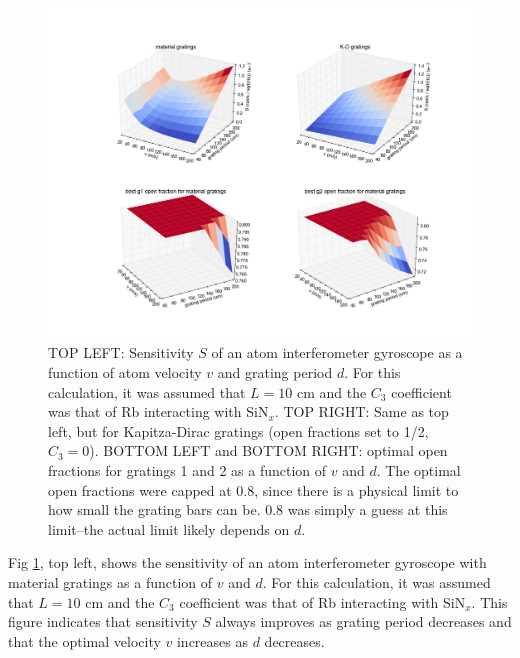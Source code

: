 \documentclass[twocolumn,pra,showpacs,superscriptaddress,longbibliography]{revtex4-1}   %
\begin{document}
\begin{figure}
\includegraphics[width=\linewidth,keepaspectratio]{../plots/Sf1f2_vs_dv_Rb_L10cm.png}
\caption{\label{S_vs_dv} TOP LEFT: Sensitivity $S$ of an atom interferometer gyroscope as a function of atom velocity $v$ and grating period $d$. For this calculation, it was assumed that $L = 10$ cm and the $C_3$ coefficient was that of Rb interacting with SiN$_x$. TOP RIGHT: Same as top left, but for Kapitza-Dirac gratings (open fractions set to 1/2, $C_3 = 0$). BOTTOM LEFT and BOTTOM RIGHT: optimal open fractions for gratings 1 and 2 as a function of $v$ and $d$. The optimal open fractions were capped at 0.8, since there is a physical limit to how small the grating bars can be. 0.8 was simply a guess at this limit--the actual limit likely depends on $d$.}
\end{figure}

Fig \ref{S_vs_dv}, top left, shows the sensitivity of an atom interferometer gyroscope with material gratings as a function of $v$ and $d$. For this calculation, it was assumed that $L = 10$ cm and the $C_3$ coefficient was that of Rb interacting with SiN$_x$. This figure indicates that sensitivity $S$ always improves as grating period decreases and that the optimal velocity $v$ increases as $d$ decreases. 





\end{document}
